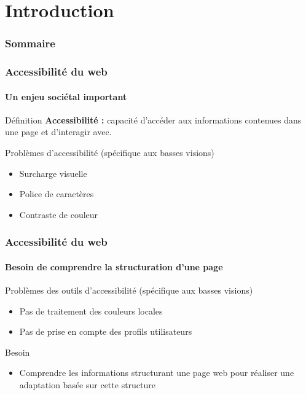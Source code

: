 \documentclass[9pt]{beamer}
\begin{document}
\section{Introduction} 
\begin{frame}
  \frametitle{Sommaire}
\end{frame}

\begin{frame}
	\frametitle{Accessibilité du web}
	\framesubtitle{Un enjeu sociétal important}
	\begin{block}{Définition}
	\textbf{Accessibilité :} capacité d'accéder aux informations contenues dans une page et d'interagir avec.
	\end{block}
	\begin{block}{Problèmes d'accessibilité (spécifique aux basses visions)}
		\begin{itemize}
			\item Surcharge visuelle
			\item Police de caractères
			\item Contraste de couleur
		\end{itemize}
	\end{block}
\end{frame}

\begin{frame}
\frametitle{Accessibilité du web}
\framesubtitle{Besoin de comprendre la structuration d'une page}
	\begin{block}{Problèmes des outils d'accessibilité (spécifique aux basses visions)}
	\begin{itemize}
		\item Pas de traitement des couleurs locales
		\item Pas de prise en compte des profils utilisateurs
	\end{itemize}
	\end{block}
	\begin{block}{Besoin}
	\begin{itemize}
		\item Comprendre les informations structurant une page web pour réaliser une adaptation basée sur cette structure
	\end{itemize}
	\end{block}
\end{frame}
\end{document}

